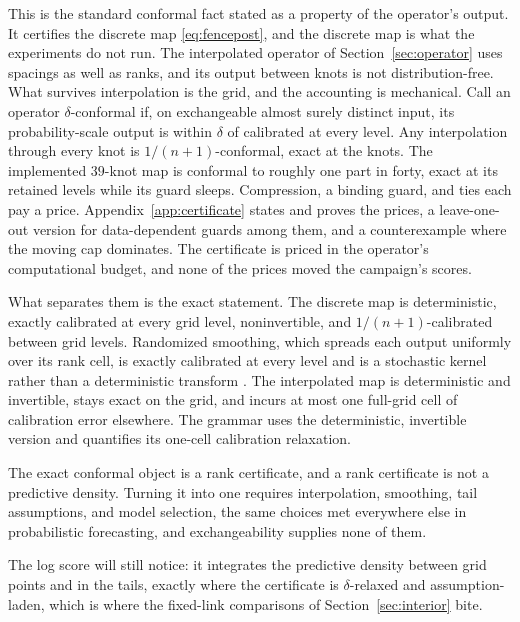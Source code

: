 \documentclass[11pt]{article}
\theoremstyle{remark}
\begin{document}
This is the standard conformal fact \citep{vovk2005algorithmic} stated as a property of the
operator's output. It certifies the discrete map \eqref{eq:fencepost}, and the discrete
map is what the experiments do not run. The interpolated operator of
Section~\ref{sec:operator} uses spacings as well as ranks, and its output between knots
is not distribution-free. What survives interpolation is the grid, and the
accounting is mechanical. Call an operator $\delta$-conformal if, on exchangeable
almost surely distinct input, its probability-scale output is within $\delta$ of
calibrated at every level. Any interpolation through every knot is
$1/(n+1)$-conformal, exact at the knots. The implemented $39$-knot map is conformal
to roughly one part in forty, exact at its retained levels while its guard sleeps.
Compression, a binding guard, and ties each pay a price.
Appendix~\ref{app:certificate} states and proves the prices, a leave-one-out
version for data-dependent guards among them, and a counterexample where the moving
cap dominates. The certificate is priced in the operator's computational budget, and
none of the prices moved the campaign's scores.

What separates them is the exact statement. The discrete map is deterministic,
exactly calibrated at every grid level, noninvertible, and $1/(n+1)$-calibrated between
grid levels. Randomized smoothing, which spreads each output uniformly over its rank
cell, is exactly calibrated at every level and is a stochastic kernel rather than a
deterministic transform \citep{vovk2005algorithmic}. The interpolated map is
deterministic and invertible, stays exact on the grid, and incurs at most one full-grid
cell of calibration error elsewhere. The grammar uses the deterministic, invertible version and quantifies its one-cell calibration relaxation.

The exact conformal object is a rank certificate, and a rank certificate is not a
predictive density. Turning it into one requires interpolation, smoothing, tail
assumptions, and model selection, the same choices met everywhere else in probabilistic
forecasting, and exchangeability supplies none of them.

The log score will still notice: it
integrates the predictive density between grid points and in the tails, exactly where
the certificate is $\delta$-relaxed and assumption-laden, which is where the
fixed-link comparisons of Section~\ref{sec:interior} bite.
\end{document}
